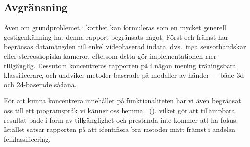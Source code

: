 \documentclass[../rapport_MVEX01-11-05]{subfiles}
\begin{document}
\subsection{Avgränsning}

Även om grundproblemet i korthet kan formuleras som en mycket generell
gestigenkänning har denna rapport begränsats något. Först och främst
har begränsas datamängden till enkel videobaserad indata, dvs.~inga sensorhandskar
eller stereoskopiska kameror, eftersom detta gör implementationen mer
tillgänglig. Dessutom koncentreras rapporten på i någon mening träningsbara
klassificerare, och undviker metoder baserade på modeller av händer --- både
3d- och 2d-baserade sådana.

För att kunna koncentrera innehållet på funktionaliteten har vi även begränsat
oss till ett programspråk vi känner oss hemma i (\MATLAB), vilket gör att
tillämpbara resultat både i form av tillgänglighet och prestanda inte kommer
att ha fokus. Istället satsar rapporten på att identifiera bra metoder mätt
främst i andelen felklassificering.

\end{document}
